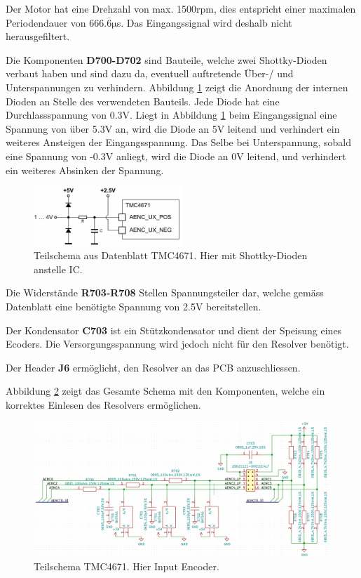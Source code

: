 Der Motor hat eine Drehzahl von max. 1500rpm, dies entspricht einer maximalen Periodendauer von $\mathrm{666.\overline{6} \mu}$s. Das Eingangssignal wird deshalb nicht herausgefiltert.

Die Komponenten \textbf{D700-D702} sind Bauteile, welche zwei Shottky-Dioden verbaut haben und sind dazu da, eventuell auftretende Über-/ und Unterspannungen zu verhindern. Abbildung \ref{fig:Schema_Encoder_2_LP} zeigt die Anordnung der internen Dioden an Stelle des
verwendeten Bauteils. Jede Diode hat eine Durchlassspannung von 0.3V. Liegt in Abbildung \ref{fig:Schema_Encoder_2_LP} beim Eingangssignal eine Spannung von über 5.3V an, wird die Diode an 5V leitend und verhindert ein weiteres Ansteigen der Eingangsspannung. Das Selbe bei Unterspannung, sobald eine Spannung von -0.3V anliegt, wird die Diode an 0V leitend, und verhindert ein weiteres Absinken der Spannung.

\begin{figure}[h!]
	\centering	\includegraphics[width=0.5\textwidth]{graphics/Schema_Encoder_2_LP.png}
	\caption{Teilschema aus Datenblatt TMC4671. Hier mit Shottky-Dioden anstelle IC.}
	\label{fig:Schema_Encoder_2_LP}
\end{figure}

Die Widerstände \textbf{R703-R708} Stellen Spannungsteiler dar, welche gemäss Datenblatt eine benötigte Spannung von 2.5V bereitstellen.

Der Kondensator \textbf{C703} ist ein Stützkondensator und dient der Speisung eines Ecoders. Die Versorgungsspannung wird jedoch nicht für den Resolver benötigt.

Der Header \textbf{J6} ermöglicht, den Resolver an das PCB anzuschliessen.

Abbildung \ref{fig:Schema_Encoder_LP} zeigt das Gesamte Schema mit den Komponenten, welche ein korrektes Einlesen des Resolvers ermöglichen.

\begin{figure}[h!]
	\centering	\includegraphics[width=\textwidth]{graphics/Schema_Encoder_LP.png}
	\caption{Teilschema TMC4671. Hier Input Encoder.}
	\label{fig:Schema_Encoder_LP}
\end{figure}
\newpage
